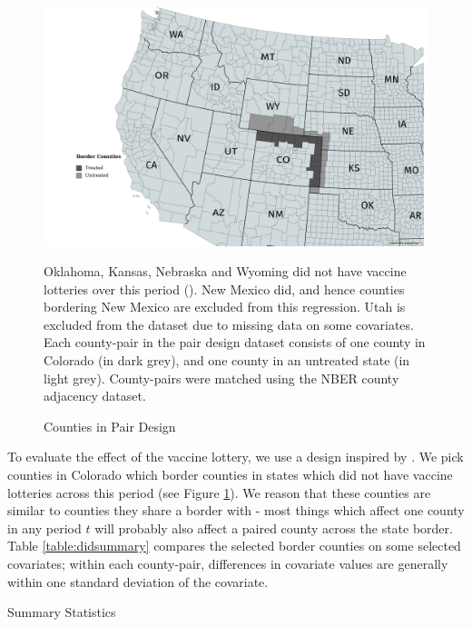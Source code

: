 \documentclass[12pt]{article}
\begin{document}
\begin{spacing}{1.5}
		\begin{figure}
			\centering
			\includegraphics[width=6in]{../graphs/Border_Counties.png}
			\caption*{\footnotesize{Oklahoma, Kansas, Nebraska and Wyoming did not have vaccine lotteries over this period (\cite{thirumurthy_association_2022}). New Mexico did, and hence counties bordering New Mexico are excluded from this regression. Utah is excluded from the dataset due to missing data on some covariates. Each county-pair in the pair design dataset consists of one county in Colorado (in dark grey), and one county in an untreated state (in light grey). County-pairs were matched using the NBER county adjacency dataset.}}
			\caption{Counties in Pair Design}
			\label{fig:bordercounties}
		\end{figure}
		
		To evaluate the effect of the vaccine lottery, we use a design inspired by \citet{dube_minimum_2010}. We pick counties in Colorado which border counties in states which did not have vaccine lotteries across this period (see Figure \ref{fig:bordercounties}). We reason that these counties are similar to counties they share a border with - most things which affect one county in any period $t$ will probably also affect a paired county across the state border. Table \ref{table:didsummary} compares the selected border counties on some selected covariates; within each county-pair, differences in covariate values are generally within one standard deviation of the covariate.
		
		\begin{table}
			\centering
			\caption{Summary Statistics}
			\centerline{}
			\label{table:didsummary}
		\end{table}
		

\end{spacing}
\end{document}
